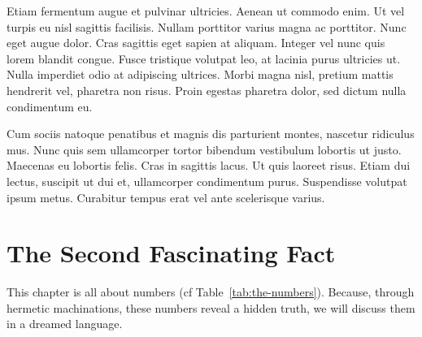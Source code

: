 \documentclass[9pt]{memoir}
\begin{document}
Etiam fermentum augue et pulvinar ultricies. Aenean ut commodo enim. Ut vel turpis eu nisl sagittis facilisis. Nullam porttitor varius magna ac porttitor. Nunc eget augue dolor. Cras sagittis eget sapien at aliquam. Integer vel nunc quis lorem blandit congue. Fusce tristique volutpat leo, at lacinia purus ultricies ut. Nulla imperdiet odio at adipiscing ultrices. Morbi magna nisl, pretium mattis hendrerit vel, pharetra non risus. Proin egestas pharetra dolor, sed dictum nulla condimentum eu.

Cum sociis natoque penatibus et magnis dis parturient montes, nascetur ridiculus mus. Nunc quis sem ullamcorper tortor bibendum vestibulum lobortis ut justo. Maecenas eu lobortis felis. Cras in sagittis lacus. Ut quis laoreet risus. Etiam dui lectus, suscipit ut dui et, ullamcorper condimentum purus. Suspendisse volutpat ipsum metus. Curabitur tempus erat vel ante scelerisque varius.



\chapter{The Second Fascinating Fact}
This chapter is all about numbers (cf Table~\ref{tab:the-numbers}). Because, through hermetic machinations, these numbers reveal a hidden truth, we will discuss them in a dreamed language.
\end{document}
